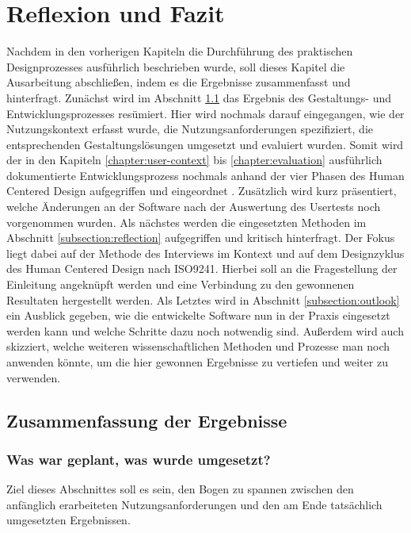 \chapter{Reflexion und Fazit}
\label{chapter:conclusion}

Nachdem in den vorherigen Kapiteln die Durchführung des praktischen
Designprozesses ausführlich beschrieben wurde, soll dieses Kapitel die
Ausarbeitung abschließen, indem es die Ergebnisse zusammenfasst und
hinterfragt. Zunächst wird im Abschnitt \ref{subsection:resultDescription} das
Ergebnis des Gestaltungs- und Entwicklungsprozesses resümiert. Hier wird
nochmals darauf eingegangen, wie der Nutzungskontext erfasst wurde, die
Nutzungsanforderungen spezifiziert, die entsprechenden Gestaltungslösungen
umgesetzt und evaluiert wurden. Somit wird der in den Kapiteln
\ref{chapter:user-context} bis \ref{chapter:evaluation} ausführlich
dokumentierte Entwicklungsprozess nochmals anhand der vier Phasen des Human
Centered Design aufgegriffen und eingeordnet \cite{ISO9241}. Zusätzlich wird
kurz präsentiert, welche Änderungen an der Software nach der Auswertung des
Usertests noch vorgenommen wurden. Als nächstes werden die eingesetzten
Methoden im Abschnitt \ref{subsection:reflection} aufgegriffen und kritisch
hinterfragt. Der Fokus liegt dabei auf der Methode des Interviews im Kontext
und auf dem Designzyklus des Human Centered Design nach ISO9241. Hierbei soll an
die Fragestellung der Einleitung angeknüpft werden und eine Verbindung zu den
gewonnenen Resultaten hergestellt werden. Als Letztes wird in Abschnitt
\ref{subsection:outlook} ein Ausblick gegeben, wie die entwickelte Software nun
in der Praxis eingesetzt werden kann und welche Schritte dazu noch notwendig
sind. Außerdem wird auch skizziert, welche weiteren wissenschaftlichen Methoden
und Prozesse man noch anwenden könnte, um die hier gewonnen Ergebnisse zu
vertiefen und weiter zu verwenden.

\section{Zusammenfassung der Ergebnisse}
\label{subsection:resultDescription}

\subsection*{Was war geplant, was wurde umgesetzt?}
Ziel dieses Abschnittes soll es sein, den Bogen zu spannen zwischen den
anfänglich erarbeiteten Nutzungsanforderungen und den am Ende tatsächlich
umgesetzten Ergebnissen.

